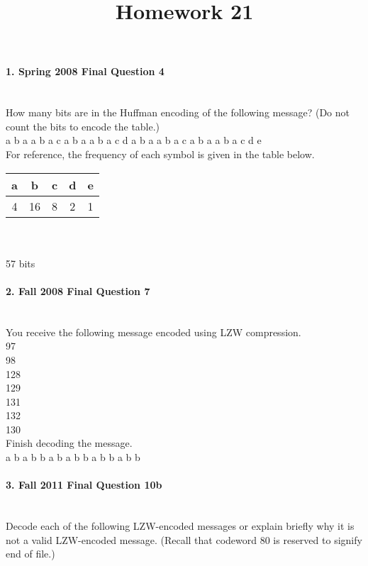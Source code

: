 \documentclass{article}
\begin{document}
\title{Homework 21}
\date{}
\maketitle


\paragraph{\Large 1. Spring 2008 Final Question 4}\mbox{}\\
How many bits are in the Huffman encoding of the following message? (Do not count the bits to encode the table.)\\
a b a a b a c a b a a b a c d a b a a b a c a b a a b a c d e\\
For reference, the frequency of each symbol is given in the table below.\\

\begin{tabular}{c | c | c | c | c}
a & b & c & d & e\\ \hline
4 & 16 & 8 & 2 & 1
\end{tabular}\\\\

57 bits

\paragraph{\Large 2. Fall 2008 Final Question 7}\mbox{}\\
You receive the following message encoded using LZW compression.\\
97\\
98\\
128\\
129\\
131\\
132\\
130\\
Finish decoding the message.\\

a \quad b \quad a \quad b \quad b \quad a \quad b \quad a \quad b \quad b \quad a \quad b \quad b \quad a \quad b \quad b

\paragraph{\Large 3. Fall 2011 Final Question 10b}\mbox{}\\
Decode each of the following LZW-encoded messages or explain briefly why it is not a valid LZW-encoded message. (Recall that codeword 80 is reserved to signify end of file.)\\
\end{document}
